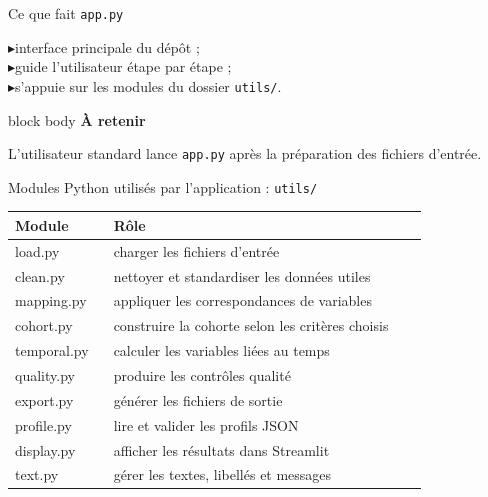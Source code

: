 \documentclass[10pt,aspectratio=169]{beamer}
\newcommand{\smallbullet}{\textcolor{MainBlue}{$\blacktriangleright$}\hspace{0.4em}}
\newenvironment{infobox}[1]
{\begin{beamercolorbox}[rounded=true,shadow=false,wd=\linewidth,sep=0.8em]{block body}
\textbf{\color{DarkBlue}#1}\par\vspace{0.3em}}
{\end{beamercolorbox}}
\begin{document}
\begin{frame}{Ce que fait \texttt{app.py}}
\centering
{}

\vspace{1cm}
\begin{flushleft}
\smallbullet interface principale du dépôt ;\\
\smallbullet guide l'utilisateur étape par étape ;\\
\smallbullet s'appuie sur les modules du dossier \texttt{utils/}.
\end{flushleft}

\vfill
\begin{infobox}{À retenir}
L'utilisateur standard lance \texttt{app.py} après la préparation des fichiers d'entrée.
\end{infobox}
\end{frame}

\begin{frame}{Modules Python utilisés par l'application : \texttt{utils/}}
\small
\begin{tabular}{>{\ttfamily}p{0.22\linewidth} p{0.70\linewidth}}
\toprule
\textbf{Module} & \textbf{Rôle}\\
\midrule
load.py & charger les fichiers d'entrée\\
clean.py & nettoyer et standardiser les données utiles\\
mapping.py & appliquer les correspondances de variables\\
cohort.py & construire la cohorte selon les critères choisis\\
temporal.py & calculer les variables liées au temps\\
quality.py & produire les contrôles qualité\\
export.py & générer les fichiers de sortie\\
profile.py & lire et valider les profils JSON\\
display.py & afficher les résultats dans Streamlit\\
text.py & gérer les textes, libellés et messages\\
\bottomrule
\end{tabular}
\end{frame}
\end{document}
